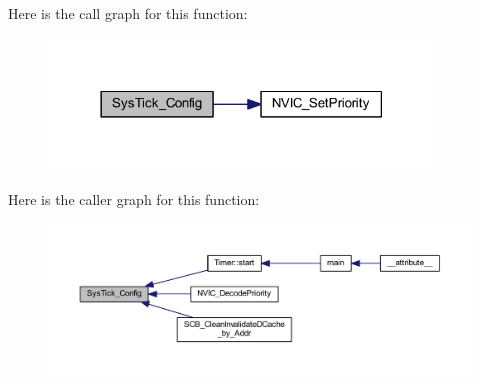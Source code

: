 Here is the call graph for this function\+:
\nopagebreak
\begin{figure}[H]
\begin{center}
\leavevmode
\includegraphics[width=290pt]{group___c_m_s_i_s___core___sys_tick_functions_gae4e8f0238527c69f522029b93c8e5b78_cgraph}
\end{center}
\end{figure}
Here is the caller graph for this function\+:
\nopagebreak
\begin{figure}[H]
\begin{center}
\leavevmode
\includegraphics[width=350pt]{group___c_m_s_i_s___core___sys_tick_functions_gae4e8f0238527c69f522029b93c8e5b78_icgraph}
\end{center}
\end{figure}
